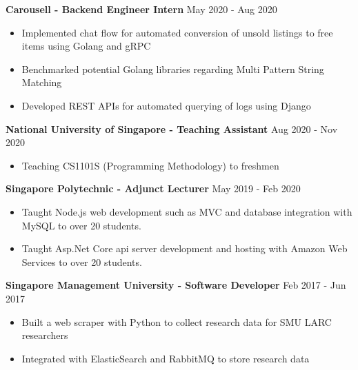 \documentclass[11pt]{article} %
\begin{document}
\medskip

\textbf{Carousell - Backend Engineer Intern} \hfill May 2020 - Aug 2020

\smallskip
\begin{itemize}

    \item Implemented chat flow for automated conversion of unsold listings to free items using Golang and gRPC
    \item Benchmarked potential Golang libraries regarding Multi Pattern String Matching
    \item Developed REST APIs for automated querying of logs using Django

\end{itemize}

\medskip

\textbf{National University of Singapore - Teaching Assistant} \hfill Aug 2020 - Nov 2020

\smallskip
\begin{itemize}

    \item Teaching CS1101S (Programming Methodology) to freshmen

\end{itemize}

\medskip

\textbf{Singapore Polytechnic - Adjunct Lecturer} \hfill May 2019 - Feb 2020

\smallskip
\begin{itemize}

    \item Taught Node.js web development such as MVC and database integration with MySQL to over 20 students.
    \item Taught Asp.Net Core api server development and hosting with Amazon Web Services to over 20 students.

\end{itemize}

\medskip

\textbf{Singapore Management University - Software Developer} \hfill Feb 2017 - Jun 2017

\smallskip
\begin{itemize}

    \item Built a web scraper with Python to collect research data for SMU LARC researchers
    \item Integrated with ElasticSearch and RabbitMQ to store research data

\end{itemize}
\end{document}
